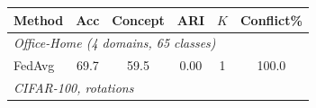 \scriptsize
\begin{tabular}{lccccc}
\toprule
Method & Acc & Concept & ARI & $K$ & Conflict\% \\
\midrule
\multicolumn{6}{l}{\textit{Office-Home (4 domains, 65 classes)}}\\
FedAvg & 69.7 & 59.5 & 0.00 & 1 & 100.0 \\
\midrule
\multicolumn{6}{l}{\textit{CIFAR-100, rotations}}\\
\bottomrule
\end{tabular}
